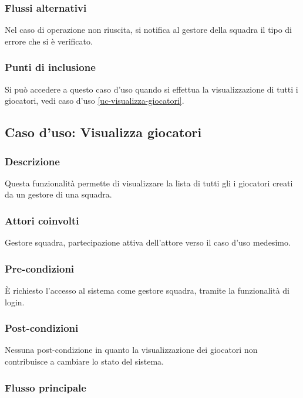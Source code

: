 \subsubsection*{Flussi alternativi}
Nel caso di operazione non riuscita, si notifica al gestore della squadra il tipo di errore che si è verificato.

\subsubsection*{Punti di inclusione}
Si può accedere a questo caso d'uso quando si effettua la visualizzazione di tutti i giocatori, vedi caso d'uso \vref{uc-visualizza-giocatori}.


%
%
\subsection{Caso d'uso: Visualizza giocatori}
\label{uc-visualizza-giocatori}

\subsubsection*{Descrizione}
Questa funzionalità permette di visualizzare la lista di tutti gli i giocatori creati da un gestore di una squadra.

\subsubsection*{Attori coinvolti}
Gestore squadra, partecipazione attiva dell'attore verso il caso d'uso medesimo.

\subsubsection*{Pre-condizioni}
È richiesto l'accesso al sistema come gestore squadra, tramite la funzionalità di login.

\subsubsection*{Post-condizioni}
Nessuna post-condizione in quanto la visualizzazione dei giocatori non contribuisce a cambiare lo stato del sistema.

\subsubsection*{Flusso principale}


